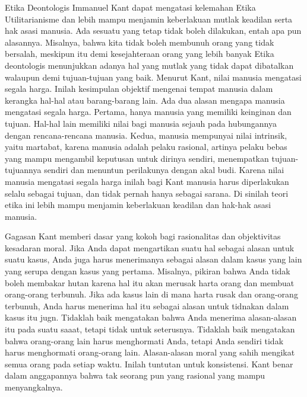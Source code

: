 \documentclass[10pt,a4paper]{article}
\begin{document}
\begin{multicols}{2}
Etika Deontologis Immanuel Kant dapat mengatasi kelemahan Etika
Utilitarianisme dan lebih mampu menjamin keberlakuan mutlak keadilan
serta hak asasi manusia. Ada sesuatu yang tetap tidak boleh dilakukan,
entah apa pun alasannya. Misalnya, bahwa kita tidak boleh membunuh orang
yang tidak bersalah, meskipun itu demi kesejahteraan orang yang lebih
banyak Etika deontologis menunjukkan adanya hal yang mutlak yang tidak
dapat dibatalkan walaupun demi tujuan-tujuan yang baik. Menurut Kant,
nilai manusia mengatasi segala harga. Inilah kesimpulan objektif
mengenai tempat manusia dalam kerangka hal-hal atau barang-barang lain.
Ada dua alasan mengapa manusia mengatasi segala harga. Pertama, hanya
manusia yang memiliki keinginan dan tujuan. Hal-hal lain memiliki nilai
bagi manusia sejauh pada hubungannya dengan rencana-rencana manusia.
Kedua, manusia mempunyai nilai intrinsik, yaitu martabat, karena manusia
adalah pelaku rasional, artinya pelaku bebas yang mampu mengambil
keputusan untuk dirinya sendiri, menempatkan tujuan-tujuannya sendiri
dan menuntun perilakunya dengan akal budi. Karena nilai manusia
mengatasi segala harga inilah bagi Kant manusia harus diperlakukan
selalu sebagai tujuan, dan tidak pernah hanya sebagai sarana. Di sinilah
teori etika ini lebih mampu menjamin keberlakuan keadilan dan hak-hak
asasi manusia.

Gagasan Kant memberi dasar yang kokoh bagi rasionalitas dan objektivitas
kesadaran moral. Jika Anda dapat mengartikan suatu hal sebagai alasan
untuk suatu kasus, Anda juga harus menerimanya sebagai alasan dalam
kasus yang lain yang serupa dengan kasus yang pertama. Misalnya, pikiran
bahwa Anda tidak boleh membakar hutan karena hal itu akan merusak harta
orang dan membuat orang-orang terbunuh. Jika ada kasus lain di mana
harta rusak dan orang-orang terbunuh, Anda harus menerima hal itu
sebagai alasan untuk tidnakan dalam kasus itu jugn. Tidaklah baik
mengatakan bahwa Anda menerima alasan-alasan itu pada suatu saaat,
tetapi tidak untuk seterusnya. Tidaklah baik mengatakan bahwa
orang-orang lain harus menghormati Anda, tetapi Anda sendiri tidak harus
menghormati orang-orang lain. Alasan-alasan moral yang sahih mengikat
semua orang pada setiap waktu. Inilah tuntutan untuk konsistensi. Kant
benar dalam anggapannya bahwa tak seorang pun yang rasional yang mampu
menyangkalnya.


\end{multicols}
\end{document}
